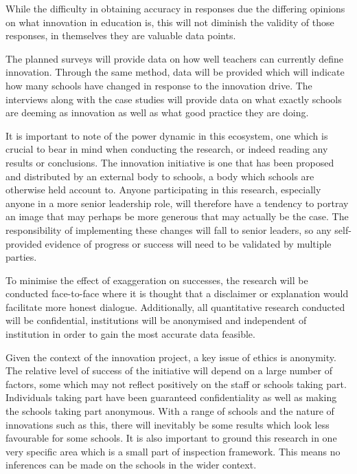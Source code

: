 \documentclass[11pt]{article}
\begin{document}
While the difficulty in obtaining accuracy in responses due the differing opinions on what innovation in education is, this will not diminish the validity of those responses, in themselves they are valuable data points. 

The planned surveys will provide data on how well teachers can currently define innovation. Through the same method, data will be provided which will indicate how many schools have changed in response to the innovation drive. The interviews along with the case studies will provide data on what exactly schools are deeming as innovation as well as what good practice they are doing. 

It is important to note of the power dynamic in this ecosystem, one which is crucial to bear in mind when conducting the research, or indeed reading any results or conclusions. The innovation initiative is one that has been proposed and distributed by an external body to schools, a body which schools are otherwise held account to. Anyone participating in this research, especially anyone in a more senior leadership role, will therefore have a tendency to portray an image that may perhaps be more generous that may actually be the case. The responsibility of implementing these changes will fall to senior leaders, so any self-provided evidence of progress or success will need to be validated by multiple parties.

To minimise the effect of exaggeration on successes, the research will be conducted face-to-face where it is thought that a disclaimer or explanation would facilitate more honest dialogue. Additionally, all quantitative research conducted will be confidential, institutions will be anonymised  and independent of institution in order to gain the most accurate data feasible. 

Given the context of the innovation project, a key issue of ethics is anonymity. The relative level of success of the initiative will depend on a large number of factors, some which may not reflect positively on the staff or schools taking part. Individuals taking part have been guaranteed confidentiality as well as making the schools taking part anonymous. With a range of schools and the nature of innovations such as this, there will inevitably be some results which look less favourable for some schools. It is also important to ground this research in one very specific area which is a small part of inspection framework. This means no inferences can be made on the schools in the wider context.
\end{document}
